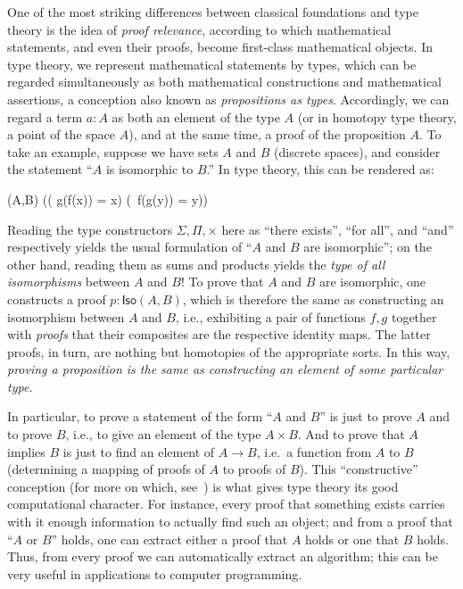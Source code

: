 One of the most striking differences between classical foundations and type theory is the idea of \emph{proof relevance}, according to which mathematical statements, and even their proofs, become first-class mathematical objects.
In type theory, we represent mathematical statements by types, which can be regarded simultaneously as both mathematical constructions and mathematical assertions, a conception also known as \emph{propositions as types}.
%
Accordingly, we can regard a term $a : A$ as both an element of the type $A$ (or in homotopy type theory, a point of the space $A$), and at the same time, a proof of the proposition $A$.
To take an example, suppose we have sets $A$ and $B$ (discrete spaces),
%
and consider the statement ``$A$ is isomorphic to $B$.''
In type theory, this can be rendered as:
\begin{narrowmultline*}
  (A,B)  \narrowbreak
  \Big(\big( g(f(x)) = x\big) \times \big(\, f(g(y)) = y\big)\Big)
\end{narrowmultline*}
%
Reading the type constructors $\Sigma, \Pi, \times$  here  as ``there exists'', ``for all'', and ``and'' respectively yields the usual formulation of ``$A$ and $B$ are isomorphic''; on the other hand, reading them as sums and products yields the \emph{type of all isomorphisms} between $A$ and $B$!  To prove that $A$ and $B$ are isomorphic, one  constructs a proof $p : \mathsf{Iso}(A,B)$, which is therefore the same  as constructing an isomorphism between $A$ and $B$, i.e., exhibiting a pair of functions $f, g$ together with \emph{proofs} that their composites are the respective identity maps.  The latter proofs, in turn, are nothing but homotopies of the appropriate sorts.  In this way, \emph{proving a proposition is the same as constructing an element of some particular type.}

In particular, to prove a statement of the form ``$A$ and $B$'' is just to prove $A$ and to prove $B$, i.e., to give an element of the type $A\times B$.
And to prove that $A$ implies $B$ is just to find an element of $A\to B$, i.e.\ a function from $A$ to $B$ (determining a mapping of proofs of $A$ to proofs of $B$).
This ``constructive'' conception (for more on which, see~\cite{kolmogorov,TroelstraI,TroelstraII}) is what gives type theory its good 
computational character.
For instance, every proof that something exists carries with it enough information to actually find such an object; and from a proof that  ``$A$ or $B$'' holds, one can extract either a proof that $A$ holds or one that $B$ holds.
Thus, from every proof we can automatically extract an algorithm; this can be very useful in applications to computer programming.

